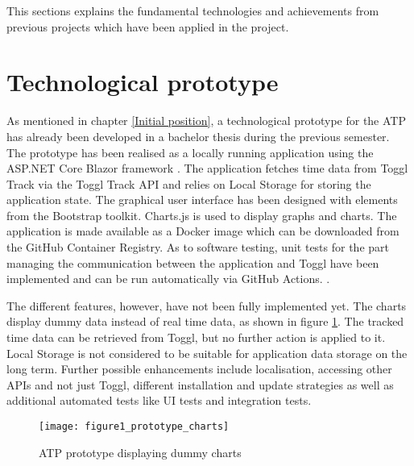 
This sections explains the fundamental technologies and achievements from previous projects which have been applied in the project.

\section{Technological prototype}
As mentioned in chapter \ref{Initial position}, a technological prototype for the ATP has already been developed in a bachelor thesis during the previous semester.
The prototype has been realised as a locally running application using the ASP.NET Core Blazor framework \cite{bachelorarbeit_Egger_Verstappen_page4}. The application
fetches time data from Toggl Track via the Toggl Track API and relies on Local Storage for storing the application state. The graphical user interface has been designed
with elements from the Bootstrap toolkit. Charts.js is used to display graphs and charts. The application is made available as a Docker image which can be downloaded
from the GitHub Container Registry. As to software testing, unit tests for the part managing the communication between the application and Toggl have been implemented and
can be run automatically via GitHub Actions. \cite{bachelorarbeit_Egger_Verstappen_page23-25}.

The different features, however, have not been fully implemented yet. The charts display dummy data instead of real time data, as shown in figure \ref{figure1}. The tracked 
time data can be retrieved from Toggl, but no further action is applied to it. Local Storage is not considered to be suitable for application data storage on the long term.
Further possible enhancements include localisation, accessing other APIs and not just Toggl, different installation and update strategies as well as additional automated tests 
like UI tests and integration tests. \cite{bachelorarbeit_Egger_Verstappen_page26-27}

\begin{figure}[H]
\centering
\texttt{[image: figure1\_prototype\_charts]}
\caption{ATP prototype displaying dummy charts}
\label{figure1}
\end{figure}

